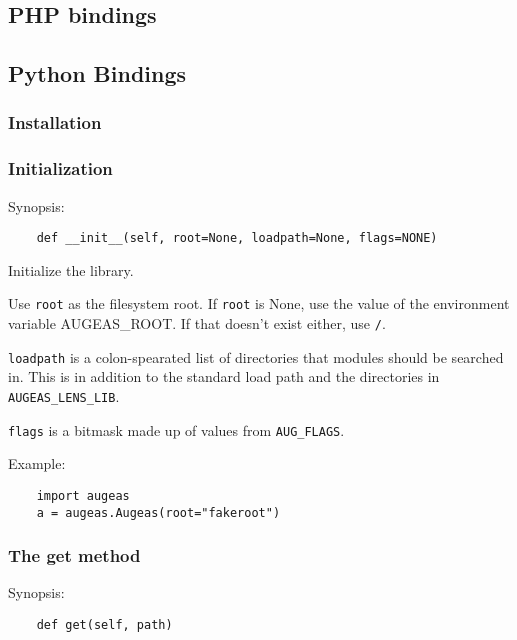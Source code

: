
\subsection{PHP bindings}


\subsection{Python Bindings}


\subsubsection{Installation}

\subsubsection{Initialization}

Synopsis:

\begin{verbatim}
    def __init__(self, root=None, loadpath=None, flags=NONE)
\end{verbatim}

Initialize the library.

Use \verb!root! as the filesystem root. If \verb!root! is None, use the value of the environment variable AUGEAS\_ROOT. If that doesn't exist either, use \nolinkurl{/}.

\verb!loadpath! is a colon-spearated list of directories that modules should be searched in. This is in addition to the standard load path and the directories in \verb!AUGEAS_LENS_LIB!.

\verb!flags! is a bitmask made up of values from \verb!AUG_FLAGS!.

Example:

\begin{verbatim}
    import augeas
    a = augeas.Augeas(root="fakeroot")
\end{verbatim}

\subsubsection{The get method}

Synopsis:

\begin{verbatim}
    def get(self, path)
\end{verbatim}

